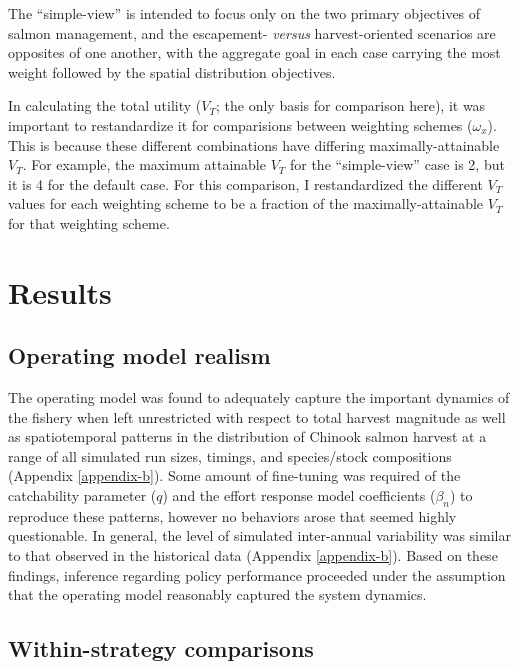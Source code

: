 \documentclass[12pt,]{book}
\theoremstyle{definition}
\theoremstyle{definition}
\theoremstyle{definition}
\theoremstyle{remark}
\begin{document}
\noindent
The ``simple-view'' is intended to focus only on the two primary
objectives of salmon management, and the escapement- \emph{versus}
harvest-oriented scenarios are opposites of one another, with the
aggregate goal in each case carrying the most weight followed by the
spatial distribution objectives.

In calculating the total utility (\(V_T\); the only basis for comparison
here), it was important to restandardize it for comparisions between
weighting schemes (\(\omega_x\)). This is because these different
combinations have differing maximally-attainable \(V_T\). For example,
the maximum attainable \(V_T\) for the ``simple-view'' case is 2, but it
is 4 for the default case. For this comparison, I restandardized the
different \(V_T\) values for each weighting scheme to be a fraction of
the maximally-attainable \(V_T\) for that weighting scheme.

\section{Results}\label{results}

\subsection{Operating model realism}\label{operating-model-realism}

\noindent
The operating model was found to adequately capture the important
dynamics of the fishery when left unrestricted with respect to total
harvest magnitude as well as spatiotemporal patterns in the distribution
of Chinook salmon harvest at a range of all simulated run sizes,
timings, and species/stock compositions (Appendix \ref{appendix-b}).
Some amount of fine-tuning was required of the catchability parameter
(\(q\)) and the effort response model coefficients (\(\beta_n\)) to
reproduce these patterns, however no behaviors arose that seemed highly
questionable. In general, the level of simulated inter-annual
variability was similar to that observed in the historical data
(Appendix \ref{appendix-b}). Based on these findings, inference
regarding policy performance proceeded under the assumption that the
operating model reasonably captured the system dynamics.

\subsection{Within-strategy
comparisons}\label{within-strategy-comparisons-1}
\end{document}
